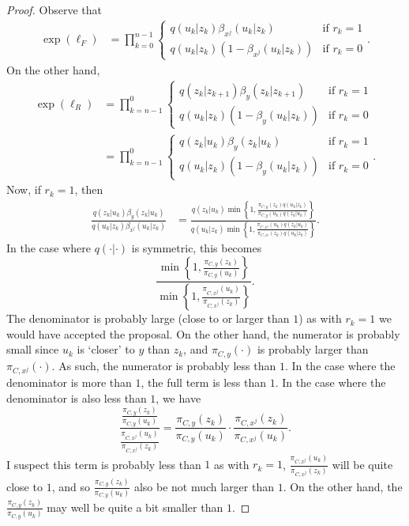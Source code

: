 \documentclass[12pt]{article}
\theoremstyle{definition}
\theoremstyle{remark}
\theoremstyle{plain}
\begin{document}
\begin{proof}
Observe that 
\begin{align*}
  \exp\left(\ell_F\right) 
  &= \prod_{k=0}^{n-1} \begin{cases}
    q(u_k|z_k) \beta_{x^j}(u_k|z_k) & \text{if } r_k = 1 \\
    q(u_k|z_k) (1-\beta_{x^j}(u_k|z_k)) & \text{if } r_k = 0
  \end{cases}.
\end{align*}
On the other hand, 
\begin{align*}
  \exp\left(\ell_R\right) 
  &= \prod_{k=n-1}^{0} \begin{cases}
    q(z_k|z_{k+1}) \beta_y(z_k|z_{k+1}) & \text{if } r_k = 1 \\
    q(u_k|z_{k}) (1-\beta_y(u_k|z_{k})) & \text{if } r_k = 0
  \end{cases}\\
  &= \prod_{k=n-1}^{0} \begin{cases}
    q(z_k|u_k) \beta_y(z_k|u_k) & \text{if } r_k = 1 \\
    q(u_k|z_{k}) (1-\beta_y(u_k|z_{k})) & \text{if } r_k = 0
  \end{cases}.
\end{align*}
Now, if $r_k = 1$, then
\begin{align*}
  \frac{q(z_k|u_k) \beta_y(z_k|u_k)}{q(u_k|z_k) \beta_{x^j}(u_k|z_k)}
  &= \frac{q(z_k|u_k) \min\left\{1, \frac{\pi_{C,y}(z_k)q(u_k|z_k)}{\pi_{C,y}(u_k)q(z_k|u_k)}\right\}}{q(u_k|z_k) \min\left\{1, \frac{\pi_{C,x^j}(u_k)q(z_k|u_k)}{\pi_{C,x^j}(z_k)q(u_k|z_k)}\right\}}.
\end{align*}
In the case where $q(\cdot|\cdot)$ is symmetric, this becomes 
\[
  \frac{\min\left\{1, \frac{\pi_{C,y}(z_k)}{\pi_{C,y}(u_k)}\right\}}{\min\left\{1, \frac{\pi_{C,x^j}(u_k)}{\pi_{C,x^j}(z_k)}\right\}}.
\]
The denominator is probably large (close to or larger than $1$) as with $r_k=1$ we would have accepted the proposal. 
On the other hand, the numerator is probably small since $u_k$ is `closer' to $y$ than $z_k$, 
and $\pi_{C,y}(\cdot)$ is probably larger than $\pi_{C,x^j}(\cdot)$. 
As such, the numerator is probably less than $1$. 
In the case where the denominator is more than $1$,
the full term is less than $1$.
In the case where the denominator is also less than $1$, we have
\[
  \frac{\frac{\pi_{C,y}(z_k)}{\pi_{C,y}(u_k)}}{\frac{\pi_{C,x^j}(u_k)}{\pi_{C,x^j}(z_k)}}
  = \frac{\pi_{C,y}(z_k)}{\pi_{C,y}(u_k)} \cdot \frac{\pi_{C,x^j}(z_k)}{\pi_{C,x^j}(u_k)}.
\]
I suspect this term is probably less than $1$ as with $r_k=1$, $\frac{\pi_{C,x^j}(u_k)}{\pi_{C,x^j}(z_k)}$ 
will be quite close to $1$, and so $\frac{\pi_{C,y}(z_k)}{\pi_{C,y}(u_k)}$ also be not much larger than $1$.
On the other hand, the $\frac{\pi_{C,y}(z_k)}{\pi_{C,y}(u_k)}$ may well be quite a bit smaller than $1$. 


\end{proof}
\end{document}
